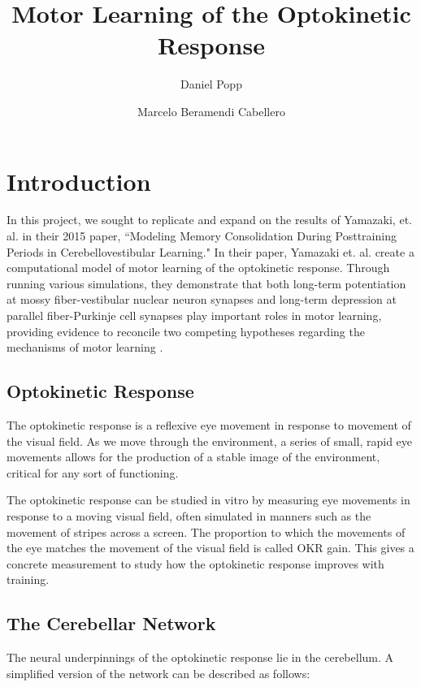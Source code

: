 \documentclass[10pt]{article}
\title{Motor Learning of the Optokinetic Response}
\author[1]{Daniel Popp}
\author[2]{Marcelo Beramendi Cabellero}
\affil[1]{Report Author}
\affil[2]{Project Partner}
\begin{document}
\maketitle

\section{Introduction}

In this project, we sought to replicate and expand on the results of Yamazaki, et. al. in their 2015 paper, ``Modeling Memory Consolidation During Posttraining
Periods in Cerebellovestibular Learning." In their paper, Yamazaki et. al. create a computational model of motor learning of the optokinetic response. Through running various simulations, they demonstrate that both long-term potentiation at mossy fiber-vestibular nuclear neuron synapses and long-term depression at parallel fiber-Purkinje cell synapses play important roles in motor learning, providing evidence to reconcile two competing hypotheses regarding the mechanisms of motor learning \cite{yamazaki2015modeling}.

\subsection{Optokinetic Response}

The optokinetic response is a reflexive eye movement in response to movement of the visual field. As we move through the environment, a series of small, rapid eye movements allows for the production of a stable image of the environment, critical for any sort of functioning.

The optokinetic response can be studied in vitro by measuring eye movements in response to a moving visual field, often simulated in manners such as the movement of stripes across a screen. The proportion to which the movements of the eye matches the movement of the visual field is called OKR gain. This gives a concrete measurement to study how the optokinetic response improves with training.

\subsection{The Cerebellar Network}

The neural underpinnings of the optokinetic response lie in the cerebellum. A simplified version of the network can be described as follows:
\end{document}
